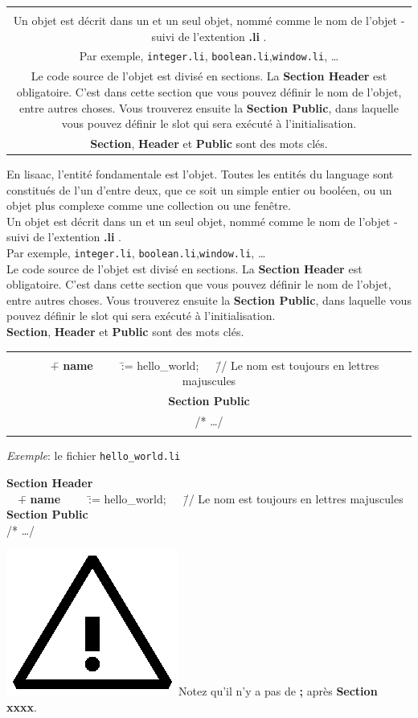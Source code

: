 \documentclass[11pt]{mybook}
\newcommand{\warning}{\includegraphics[scale=0.3]{figures/warning}}
\newcommand{\fr}[1]{
  \if \frenchversion 1
    \if \englishversion 1    
    \vspace{2mm}
    \noindent\begin{tabular}{|c}
      {
        \begin{minipage}{15.5cm}
          \textit{#1}
        \end{minipage}
      }
    \end{tabular}
    \else
    #1
    \fi
  \fi
}
\begin{document}
\fr{
En lisaac, l'entit\'e fondamentale est l'objet. Toutes les entit\'es du language sont 
constitu\'es de l'un d'entre deux, que ce soit un simple entier ou bool\'een,
ou un objet plus complexe comme une collection ou une fen\^etre.\\
Un objet est d\'ecrit dans un et un seul objet, nomm\'e comme le nom de
l'objet - suivi de l'extention {\bf{} .li} .\\ 
Par exemple, {\tt{}integer.li}, {\tt{}boolean.li},{\tt{}window.li}, \ldots\\
Le code source de l'objet est divis\'e en sections.
La {\bf{}Section Header} est obligatoire. C'est dans cette section que
vous pouvez d\'efinir le nom de l'objet, entre autres choses. 
Vous trouverez ensuite la {\bf{}Section Public}, dans laquelle vous
pouvez d\'efinir le slot qui sera ex\'ecut\'e \`a l'initialisation.\\ 
{\bf{}Section},  {\bf{}Header} et  {\bf{}Public} sont des mots
cl\'es.
}
\fr{
{\it{}Exemple}: le fichier {\tt{}hello\_world.li}
{\tt\begin{tabbing}
{\bf{}Section Header}\\
~~\=+ {\bf{}name}~~~~~\=:= {\sc{}hello\_world};~~~\=// Le nom est toujours en lettres majuscules \\
{\bf{}Section Public}\\
  \>/* \ldots */\\
\end{tabbing}
}
\warning{Notez qu'il n'y a pas de {\bf{} ;} apr\`es {\bf{}Section xxxx}.}
}

\end{document}
